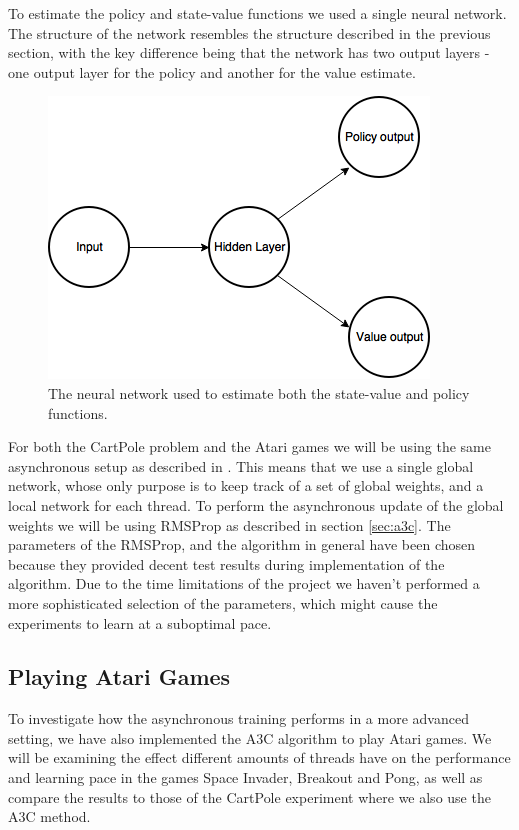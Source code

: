 \documentclass[11pt]{article}
\begin{document}
To estimate the policy and state-value functions we used a single
neural network.
The structure of the network resembles the structure described in the previous section, 
with the key difference being that the network has two output layers -
one output layer for the policy and another for the value estimate.

\begin{figure}[H]
    \centering
    \includegraphics[scale=0.5]{include/shared_cartpole.png}
    \caption{The neural network used to estimate both the state-value
             and policy functions.}
    \label{fig:s_cartpole}
\end{figure}

For both the CartPole problem and the Atari games we will be using the same asynchronous setup
as described in \cite{a3c}.
This means that we use a single global network, whose only
purpose is to keep track of a set of global weights, and a local network
for each thread.
To perform the asynchronous update of the global weights we will be using
RMSProp as described in section \ref{sec:a3c}.
The parameters of the RMSProp, and the algorithm in general have
been chosen because they provided decent test results during implementation
of the algorithm.
Due to the time limitations of the project we haven't performed
a more sophisticated selection of the parameters, which might
cause the experiments to learn at a suboptimal pace.

\subsection{Playing Atari Games}

To investigate how the asynchronous training performs in
a more advanced setting, we have also implemented the A3C algorithm
to play Atari games.
We will be examining the effect different amounts of threads
have on the performance and learning pace in the games Space Invader, Breakout
and Pong, as well as compare the results to those of the CartPole experiment
where we also use the A3C method.
\end{document}
